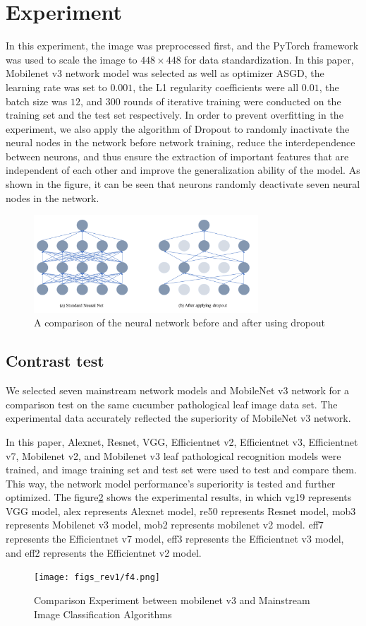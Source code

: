 \documentclass[a4paper,fleqn]{cas-sc}
\begin{document}
\section{Experiment}
In this experiment, the image was preprocessed first, and the PyTorch framework was used to scale the image to $448\times448$ for data standardization. In this paper, Mobilenet v3 network model was selected as well as optimizer ASGD, the learning rate was set to $0.001$, the L1 regularity coefficients were all $0.01$, the batch size was $12$, and $300$ rounds of iterative training were conducted on the training set and the test set respectively. In order to prevent overfitting in the experiment, we also apply the algorithm of Dropout to randomly inactivate the neural nodes in the network before network training, reduce the interdependence between neurons, and thus ensure the extraction of important features that are independent of each other and improve the generalization ability of the model. As shown in the figure, it can be seen that neurons randomly deactivate seven neural nodes in the network.
\begin{figure}
\centering
\includegraphics[width=0.75\textwidth]{figs_rev1/f3.png}
\caption{ A comparison of the neural network before and after using dropout}
\label{fig:f3}
\end{figure}

\subsection{Contrast test}
We selected seven mainstream network models and MobileNet v3 network for a comparison test on the same cucumber pathological leaf image data set. The experimental data accurately reflected the superiority of MobileNet v3 network. 

In this paper, Alexnet, Resnet, VGG, Efficientnet v2, Efficientnet v3, Efficientnet v7, Mobilenet v2, and Mobilenet v3 leaf pathological recognition models were trained, and image training set and test set were used to test and compare them. This way, the network model performance's superiority is tested and further optimized. The figure\ref{fig:f4} shows the experimental results, in which vg19 represents VGG  model, alex represents Alexnet model, re50 represents Resnet model, mob3 represents Mobilenet v3 model, mob2 represents mobilenet v2 model. eff7 represents the Efficientnet v7 model, eff3 represents the Efficientnet v3 model, and eff2 represents the Efficientnet v2 model. 
\begin{figure}
\centering
\texttt{[image: figs\_rev1/f4.png]}
\caption{Comparison Experiment between mobilenet v3 and Mainstream Image Classification Algorithms}
\label{fig:f4}
\end{figure}
\end{document}

